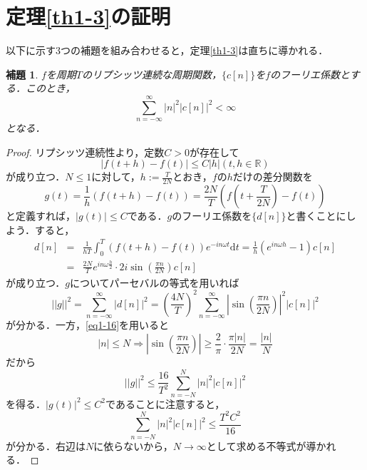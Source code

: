 \documentclass[a4j]{jsbook}
\newtheorem{lemma}[theorem]{補題}
\numberwithin{theorem}{chapter}  %
\begin{document}
\section{定理\ref{th1-3}の証明} \label{sec1-10}
以下に示す3つの補題を組み合わせると，定理\ref{th1-3}は直ちに導かれる．
\begin{lemma}
\label{lem1-10}
\(f\)を周期\(T\)のリプシッツ連続な周期関数，\(\{c[n]\}\)を\(f\)のフーリエ係数とする．このとき，
\begin{equation*}
    \sum_{n=-\infty}^\infty|n|^2\left|c[n]\right|^2<\infty
\end{equation*}
となる．
\end{lemma}
\begin{proof}
リプシッツ連続性より，定数\(C>0\)が存在して
\begin{equation*}
    |f(t+h)-f(t)|\leq C|h| (t, h\in\mathbb{R})
\end{equation*}
が成り立つ．\(N\leq 1\)に対して，\(\displaystyle h:=\frac{T}{2N}\)とおき，\(f\)の\(h\)だけの差分関数を
\begin{equation*}
    g(t)=\frac{1}{h}(f(t+h)-f(t))=\frac{2N}{T}\left(f\left(t+\frac{T}{2N}\right)-f(t)\right)
\end{equation*}
と定義すれば，\(|g(t)|\leq C\)である．\(g\)のフーリエ係数を\(\{d[n]\}\)と書くことにしよう．すると，
\begin{eqnarray*}
d[n]&=&\frac{1}{hT}\int_0^T (f(t+h)-f(t))e^{-in\omega t}\mathrm{d}t=\frac{1}{h}(e^{in\omega h}-1)c[n] \\
&=&\frac{2N}{T}e^{in\omega\frac{h}{2}}\cdot 2i\sin\left(\frac{\pi n}{2N}\right)c[n]
\end{eqnarray*}
が成り立つ．\(g\)についてパーセバルの等式を用いれば
\begin{equation*}
    ||g||^2=\sum_{n=-\infty}^\infty\left|d[n]\right|^2=\left(\frac{4N}{T}\right)^2\sum_{n=-\infty}^\infty \left|\sin\left(\frac{\pi n}{2N}\right)\right|^2\left|c[n]\right|^2
\end{equation*}
が分かる．一方，\eqref{eq1-16}を用いると
\begin{equation*}
    |n|\leq N \Rightarrow \left|\sin\left(\frac{\pi n}{2N}\right)\right|\geq\frac{2}{\pi}\cdot\frac{\pi|n|}{2N}=\frac{|n|}{N}
\end{equation*}
だから
\begin{equation*}
    ||g||^2\leq\frac{16}{T^2}\sum_{n=-N}^N |n|^2\left|c[n]\right|^2
\end{equation*}
を得る．\(|g(t)|^2\leq C^2\)であることに注意すると，
\begin{equation*}
    \sum_{n=-N}^N |n|^2\left|c[n]\right|^2\leq\frac{T^2C^2}{16}
\end{equation*}
が分かる．右辺は\(N\)に依らないから，\(N\to\infty\)として求める不等式が導かれる．
\end{proof}
\end{document}
